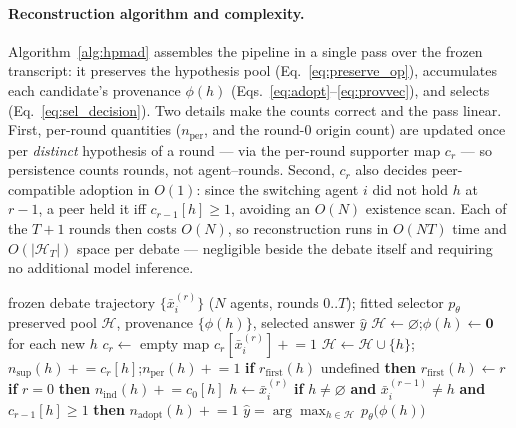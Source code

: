 \paragraph{Reconstruction algorithm and complexity.}
\label{par:algorithm}
Algorithm~\ref{alg:hpmad} assembles the pipeline in a single pass over the frozen transcript: it preserves
the hypothesis pool (Eq.~\ref{eq:preserve_op}), accumulates each candidate's provenance $\phi(h)$
(Eqs.~\ref{eq:adopt}--\ref{eq:provvec}), and selects (Eq.~\ref{eq:sel_decision}). Two details make the counts
correct and the pass linear. First, per-round quantities ($n_{\mathrm{per}}$, and the round-$0$ origin
count) are updated once per \emph{distinct} hypothesis of a round --- via the per-round supporter map
$c_r$ --- so persistence counts rounds, not agent--rounds. Second, $c_r$ also decides peer-compatible
adoption in $O(1)$: since the switching agent $i$ did not hold $h$ at $r-1$, a peer held it iff
$c_{r-1}[h]\ge 1$, avoiding an $O(N)$ existence scan. Each of the $T{+}1$ rounds then costs $O(N)$, so
reconstruction runs in $O(NT)$ time and $O(|\mathcal{H}_T|)$ space per debate --- negligible beside the
debate itself and requiring no additional model inference.

\begin{algorithm}[t]
\caption{Hypothesis Preservation, Provenance Reconstruction, and Selection}
\label{alg:hpmad}
\begin{algorithmic}[1]
\Require frozen debate trajectory $\{\bar{x}_i^{(r)}\}$ ($N$ agents, rounds $0..T$); fitted selector $p_\theta$
\Ensure  preserved pool $\mathcal{H}$, provenance $\{\phi(h)\}$, selected answer $\hat{y}$
\State $\mathcal{H}\gets\varnothing$;\quad $\phi(h)\gets\mathbf{0}$ for each new $h$
  \State $c_r\gets$ empty map 
  \quad $c_r[\bar{x}_i^{(r)}]\mathrel{+}{=}1$ \EndFor
    \State $\mathcal{H}\gets\mathcal{H}\cup\{h\}$;\quad $n_{\mathrm{sup}}(h)\mathrel{+}{=}c_r[h]$;\quad $n_{\mathrm{per}}(h)\mathrel{+}{=}1$
    \State \textbf{if} $r_{\mathrm{first}}(h)$ undefined \textbf{then} $r_{\mathrm{first}}(h)\gets r$
    \State \textbf{if} $r=0$ \textbf{then} $n_{\mathrm{ind}}(h)\mathrel{+}{=}c_0[h]$ 
  \EndFor
      \State $h\gets\bar{x}_i^{(r)}$
      \State \textbf{if} $h\ne\varnothing$ \textbf{and} $\bar{x}_i^{(r-1)}\ne h$ \textbf{and} $c_{r-1}[h]\ge 1$ \textbf{then} $n_{\mathrm{adopt}}(h)\mathrel{+}{=}1$
    \EndFor
  \EndIf
\EndFor
\State \Return $\hat{y}=\arg\max_{h\in\mathcal{H}}\,p_\theta\!\big(\phi(h)\big)$ 
\end{algorithmic}
\end{algorithm}


